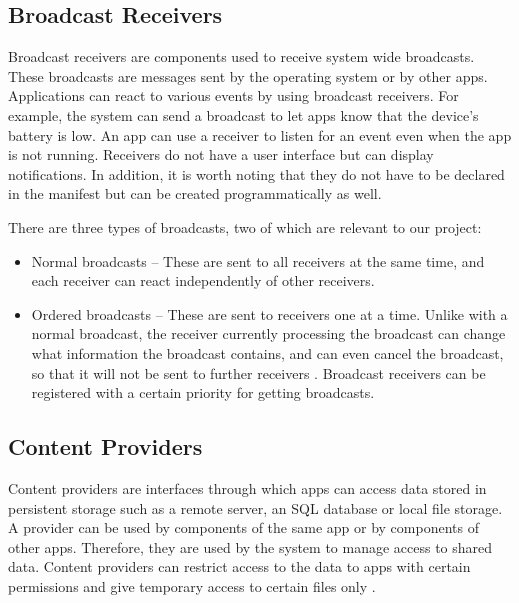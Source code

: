     \subsection{Broadcast Receivers}
        \label{subsec:receivers}
        
    Broadcast receivers are components used to receive system wide broadcasts. These broadcasts are messages sent by the operating system or by other apps. Applications can react to various events by using broadcast receivers. For example, the system can send a broadcast to let apps know that the device’s battery is low. An app can use a receiver to listen for an event even when the app is not running. Receivers do not have a user interface but can display notifications. In addition, it is worth noting that they do not have to be declared in the manifest but can be created programmatically as well.
    
    There are three types of broadcasts, two of which are relevant to our project:
    \begin{itemize}
        \item Normal broadcasts – These are sent to all receivers at the same time, and each receiver can react independently of other receivers.
        \item Ordered broadcasts – These are sent to receivers one at a time. Unlike with a normal broadcast, the receiver currently processing the broadcast can change what information the broadcast contains, and can even cancel the broadcast, so that it will not be sent to further receivers \cite{broadcasts_overview}. Broadcast receivers can be registered with a certain priority for getting broadcasts.
    \end{itemize}
    
    \subsection{Content Providers}
        \label{subsec:content_providers}
        
    Content providers are interfaces through which apps can access data stored in persistent storage such as a remote server, an SQL database or local file storage. A provider can be used by components of the same app or by components of other apps. Therefore, they are used by the system to manage access to shared data. Content providers can restrict access to the data to apps with certain permissions and give temporary access to certain files only \cite{android_app_fundamentals}.
    
